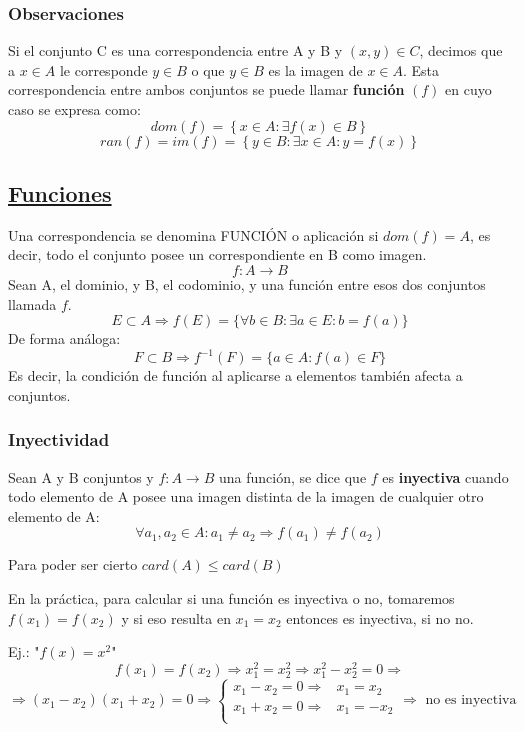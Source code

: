 \documentclass[10pt,a4paper,openright]{book}
\theoremstyle{break}
\begin{document}
\subsubsection{Observaciones}
Si el conjunto C es una correspondencia entre A y B y $(x,y)\in C$, decimos que a $x\in A$ le corresponde $y\in B$ o que $y\in B$ es la imagen de $x \in A$. Esta correspondencia entre ambos conjuntos se puede llamar \textbf{función} $(f)$ en cuyo caso se expresa como:
$$dom(f)=\left\lbrace x \in A : \exists f(x)\in B\right\rbrace$$
$$ran(f)=im(f)=\left\lbrace y\in B : \exists x \in A : y=f(x)\right\rbrace$$
\subsection{\underline{Funciones}}
Una correspondencia se denomina FUNCIÓN o aplicación si $dom(f)=A$, es decir, todo el conjunto posee un correspondiente en B como imagen.
$$f: A\rightarrow B$$
Sean A, el dominio, y B, el codominio, y una función entre esos dos conjuntos llamada $f$.
$$E\subset A\Rightarrow f(E)=\{\forall b\in B : \exists a \in E : b=f(a)\}$$
De forma análoga:
$$F\subset B\Rightarrow f^{-1}(F)=\{a \in A : f(a)\in F\}$$
Es decir, la condición de función al aplicarse a elementos también afecta a conjuntos.
\subsubsection{Inyectividad}
Sean A y B conjuntos y $f: A \rightarrow B$ una función, se dice que $f$ es \textbf{inyectiva} cuando todo elemento de A posee una imagen distinta de la imagen de cualquier otro elemento de A:
$$\forall a_1, a_2 \in A : a_1 \neq a_2\Rightarrow f(a_1)\neq f(a_2)$$

Para poder ser cierto $card(A)\leq card(B)$\par

En la práctica, para calcular si una función es inyectiva o no, tomaremos $f(x_1)=f(x_2)$ y si eso resulta en $x_1=x_2$ entonces es inyectiva, si no no.\par

Ej.:  "$f(x)=x^2$"
$$f(x_1)=f(x_2)\Rightarrow x_1^2=x_2^2\Rightarrow x_1^2-x_2^2=0 \Rightarrow$$
$$\Rightarrow (x_1-x_2)(x_1+x_2)=0 \Rightarrow
\begin{cases}
x_1-x_2=0 \Rightarrow & x_1=x_2 \\
x_1+x_2=0 \Rightarrow & x_1=-x_2 \\
\end{cases}
\Rightarrow \mbox{ no es inyectiva}$$
\end{document}
